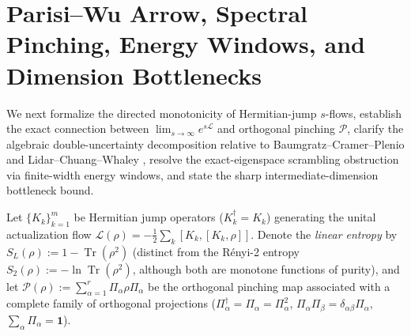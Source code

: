 \documentclass[11pt,a4paper]{article}
\theoremstyle{definition}
\theoremstyle{remark}
\newcommand{\Tr}{\operatorname{Tr}}
\newcommand{\cL}{\mathcal{L}}
\newcommand{\cP}{\mathcal{P}}
\newcommand{\1}{\mathbf{1}}
\begin{document}
\section{Parisi--Wu Arrow, Spectral Pinching, Energy Windows, and Dimension Bottlenecks}\label{sec:double-bottleneck}

We next formalize the directed monotonicity of Hermitian-jump $s$-flows, establish the exact connection between $\lim_{s\to\infty} e^{s\cL}$ and orthogonal pinching $\cP$, clarify the algebraic double-uncertainty decomposition relative to Baumgratz--Cramer--Plenio \cite{Baumgratz2014} and Lidar--Chuang--Whaley \cite{Lidar1998}, resolve the exact-eigenspace scrambling obstruction via finite-width energy windows, and state the sharp intermediate-dimension bottleneck bound.

Let $\{K_k\}_{k=1}^m$ be Hermitian jump operators ($K_k^\dagger = K_k$) generating the unital actualization flow $\cL(\rho) = -\frac{1}{2}\sum_k [K_k, [K_k, \rho]]$. Denote the \emph{linear entropy} by $S_L(\rho) := 1 - \Tr(\rho^2)$ (distinct from the R\'enyi-2 entropy $S_2(\rho) := -\ln\Tr(\rho^2)$, although both are monotone functions of purity), and let $\cP(\rho) := \sum_{\alpha=1}^r \Pi_\alpha \rho \Pi_\alpha$ be the orthogonal pinching map associated with a complete family of orthogonal projections ($\Pi_\alpha^\dagger = \Pi_\alpha = \Pi_\alpha^2$, $\Pi_\alpha\Pi_\beta = \delta_{\alpha\beta}\Pi_\alpha$, $\sum_\alpha \Pi_\alpha = \1$).
\end{document}
